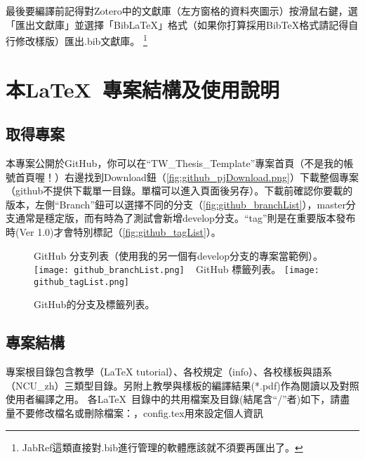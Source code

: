 \documentclass[class=NCU_thesis, crop=false, float=true]{standalone}
\begin{document}
最後要編譯前記得對Zotero中的文獻庫（左方窗格的資料夾圖示）按滑鼠右鍵，選「匯出文獻庫」並選擇「BibLaTeX」格式（如果你打算採用BibTeX格式請記得自行修改樣版）匯出.bib文獻庫。
\footnote{JabRef這類直接對.bib進行管理的軟體應該就不須要再匯出了。}

\section{本\LaTeX\ 專案結構及使用說明}
\subsection{取得專案}
本專案公開於GitHub，你可以在``TW\_Thesis\_Template''專案首頁（不是我的帳號首頁喔！）右邊找到Download鈕（\cref{fig:github_pjDownload.png}）下載整個專案（github不提供下載單一目錄。單檔可以進入頁面後另存）。下載前確認你要載的版本，左側``Branch''鈕可以選擇不同的分支（\cref{fig:github_branchList}），master分支通常是穩定版，而有時為了測試會新增develop分支。``tag''則是在重要版本發布時(Ver 1.0)才會特別標記（\cref{fig:github_tagList}）。
\begin{figure}
    \centering
    \subcaptionbox
        {GitHub 分支列表（使用我的另一個有develop分支的專案當範例）。
        \label{fig:github_branchList}}
        {\texttt{[image: github\_branchList.png]}}
    ~
    \subcaptionbox
        {GitHub 標籤列表。
        \label{fig:github_tagList}}
        {\texttt{[image: github\_tagList.png]}}
    \caption{GitHub的分支及標籤列表。}
    \label{fig:github_branch_tagList}
\end{figure}

\subsection{專案結構}
\label{sec:s_template_structure}
專案根目錄包含教學（LaTeX tutorial）、各校規定（info）、各校樣板與語系（NCU\_zh）三類型目錄。另附上教學與樣板的編譯結果(*.pdf)作為閱讀以及對照使用者編譯之用。
各\LaTeX\ 目錄中的共用檔案及目錄(結尾含``/''者)如下，請盡量不要修改檔名或刪除檔案：，config.tex用來設定個人資訊
\end{document}
